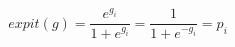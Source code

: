 \documentclass[10pt]{article}
\begin{document}
\[expit(g) = \frac{e^{g_i}}{1+e^{g_i}} = \frac{1}{1+e^{-g_i}} = p_i
\]
\end{document}
